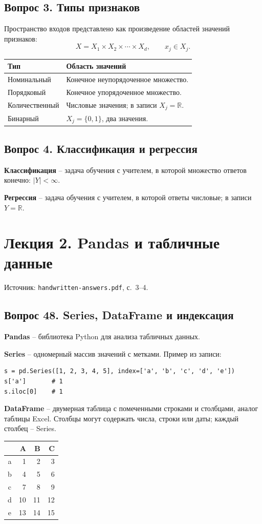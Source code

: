 \documentclass[11pt,a4paper]{article}
\newcommand{\source}[1]{{\small\color{muted}Источник: \texttt{handwritten-answers.pdf}, с.~#1.}\par}
\newcommand{\question}[2]{\subsection{Вопрос #1. #2}}
\begin{document}
\question{3}{Типы признаков}
Пространство входов представлено как произведение областей значений признаков:
\[
 X=X_1\times X_2\times\cdots\times X_d,\qquad x_j\in X_j.
\]
\begin{tabularx}{\linewidth}{@{}lY@{}}
\toprule
Тип & Область значений\\
\midrule
Номинальный & Конечное неупорядоченное множество.\\
Порядковый & Конечное упорядоченное множество.\\
Количественный & Числовые значения; в записи $X_j=\mathbb R$.\\
Бинарный & $X_j=\{0,1\}$, два значения.\\
\bottomrule
\end{tabularx}

\question{4}{Классификация и регрессия}
\textbf{Классификация} -- задача обучения с учителем, в которой множество
ответов конечно: $|Y|<\infty$.

\textbf{Регрессия} -- задача обучения с учителем, в которой ответы числовые;
в записи $Y=\mathbb R$.

\clearpage
\section{Лекция 2. Pandas и табличные данные}
\source{3--4}

\question{48}{Series, DataFrame и индексация}
\textbf{Pandas} -- библиотека Python для анализа табличных данных.

\textbf{Series} -- одномерный массив значений с метками.
Пример из записи:
\begin{verbatim}
s = pd.Series([1, 2, 3, 4, 5], index=['a', 'b', 'c', 'd', 'e'])
s['a']       # 1
s.iloc[0]    # 1
\end{verbatim}

\textbf{DataFrame} -- двумерная таблица с помеченными строками и столбцами,
аналог таблицы Excel. Столбцы могут содержать числа, строки или даты;
каждый столбец -- Series.

\begin{center}
\begin{tabular}{c|rrr}
 & A & B & C\\\hline
a & 1 & 2 & 3\\
b & 4 & 5 & 6\\
c & 7 & 8 & 9\\
d & 10 & 11 & 12\\
e & 13 & 14 & 15
\end{tabular}
\end{center}
\end{document}
